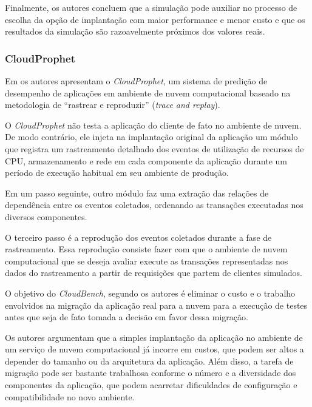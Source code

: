 Finalmente, os autores concluem que a simulação pode auxiliar no processo de escolha da opção de implantação com maior performance e menor custo e que os resultados da simulação são razoavelmente próximos dos valores reais.

\subsubsection{CloudProphet}\label{subsec:CloudProphet}
Em \cite{li2011cloudprophet} os autores apresentam o \textit{CloudProphet}, um sistema de
predição de desempenho de aplicações em ambiente de nuvem computacional baseado 
na metodologia de ``rastrear e reproduzir'' (\textit{trace and replay}).

O \textit{CloudProphet} não testa a aplicação do cliente de fato no ambiente de nuvem. De
modo contrário, ele injeta na implantação original da aplicação um módulo que 
registra um rastreamento detalhado dos eventos de utilização de recursos de CPU,
armazenamento e rede em cada componente da aplicação durante um período de 
execução habitual em seu ambiente de produção.

Em um passo seguinte, outro módulo faz uma extração das relações de dependência 
entre os eventos coletados, ordenando as transações executadas nos diversos 
componentes.

O terceiro passo é a reprodução dos eventos coletados durante a fase de 
rastreamento. Essa reprodução consiste fazer com que o ambiente de nuvem 
computacional que se deseja avaliar execute as transações representadas nos dados
do rastreamento a partir de requisições que partem de clientes simulados.
   
O objetivo do \textit{CloudBench}, segundo os autores é eliminar o custo e o trabalho 
envolvidos na migração da aplicação real para a nuvem para a execução de testes 
antes que seja de fato tomada a decisão em favor dessa migração.

Os autores argumentam que a simples implantação da aplicação no ambiente de um
serviço de nuvem computacional já incorre em custos, que podem ser altos a 
depender do tamanho ou da arquitetura da aplicação. Além disso, a tarefa de
migração pode ser bastante trabalhosa conforme o número e a diversidade dos 
componentes da aplicação, que podem acarretar dificuldades de configuração e
compatibilidade no novo ambiente.

